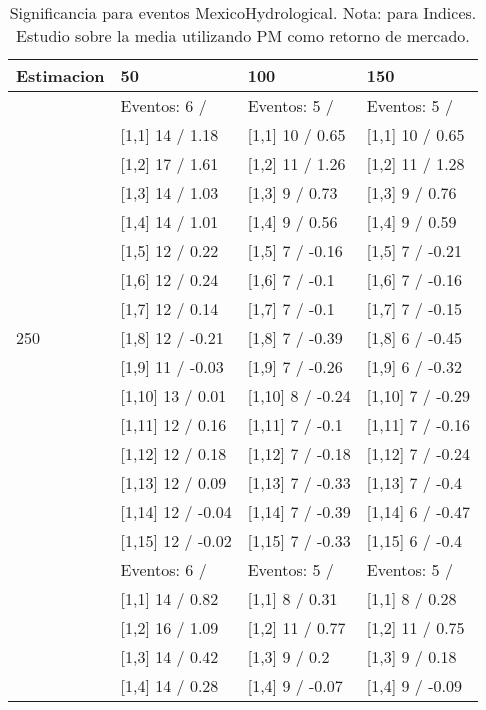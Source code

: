 \begin{table}

\caption{Significancia para eventos MexicoHydrological. Nota: para Indices. Estudio sobre la media utilizando PM como retorno de mercado.}
\centering
\begin{tabular}[t]{llll}
\toprule
Estimacion & 50 & 100 & 150\\
\midrule
 & Eventos:  6 / & Eventos:  5 / & Eventos:  5 /\\
 & {}[1,1] 14  / 1.18 & {}[1,1] 10  / 0.65 & {}[1,1] 10  / 0.65\\
 & {}[1,2] 17  / 1.61 & {}[1,2] 11  / 1.26 & {}[1,2] 11  / 1.28\\
 & {}[1,3] 14  / 1.03 & {}[1,3] 9  / 0.73 & {}[1,3] 9  / 0.76\\
 & {}[1,4] 14  / 1.01 & {}[1,4] 9  / 0.56 & {}[1,4] 9  / 0.59\\
\addlinespace
 & {}[1,5] 12  / 0.22 & {}[1,5] 7  / -0.16 & {}[1,5] 7  / -0.21\\
 & {}[1,6] 12  / 0.24 & {}[1,6] 7  / -0.1 & {}[1,6] 7  / -0.16\\
 & {}[1,7] 12  / 0.14 & {}[1,7] 7  / -0.1 & {}[1,7] 7  / -0.15\\
250 & {}[1,8] 12  / -0.21 & {}[1,8] 7  / -0.39 & {}[1,8] 6  / -0.45\\
 & {}[1,9] 11  / -0.03 & {}[1,9] 7  / -0.26 & {}[1,9] 6  / -0.32\\
\addlinespace
 & {}[1,10] 13  / 0.01 & {}[1,10] 8  / -0.24 & {}[1,10] 7  / -0.29\\
 & {}[1,11] 12  / 0.16 & {}[1,11] 7  / -0.1 & {}[1,11] 7  / -0.16\\
 & {}[1,12] 12  / 0.18 & {}[1,12] 7  / -0.18 & {}[1,12] 7  / -0.24\\
 & {}[1,13] 12  / 0.09 & {}[1,13] 7  / -0.33 & {}[1,13] 7  / -0.4\\
 & {}[1,14] 12  / -0.04 & {}[1,14] 7  / -0.39 & {}[1,14] 6  / -0.47\\
\addlinespace
 & {}[1,15] 12  / -0.02 & {}[1,15] 7  / -0.33 & {}[1,15] 6  / -0.4\\
 & Eventos:  6 / & Eventos:  5 / & Eventos:  5 /\\
 & {}[1,1] 14  / 0.82 & {}[1,1] 8  / 0.31 & {}[1,1] 8  / 0.28\\
 & {}[1,2] 16  / 1.09 & {}[1,2] 11  / 0.77 & {}[1,2] 11  / 0.75\\
 & {}[1,3] 14  / 0.42 & {}[1,3] 9  / 0.2 & {}[1,3] 9  / 0.18\\
\addlinespace
 & {}[1,4] 14  / 0.28 & {}[1,4] 9  / -0.07 & {}[1,4] 9  / -0.09\\

\end{tabular}
\end{table}
